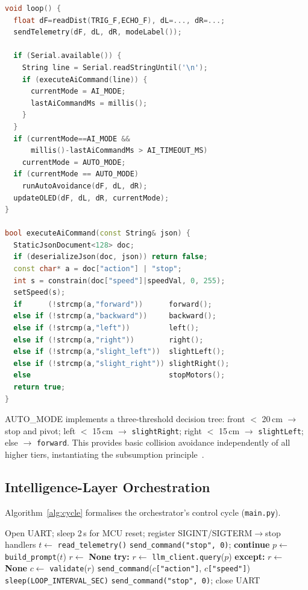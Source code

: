 \documentclass[conference]{IEEEtran}
\begin{document}
\begin{lstlisting}[language=C++, float=t, caption={Dual-mode loop and JSON dispatch (firmware, simplified)}, label={lst:firmware}]
void loop() {
  float dF=readDist(TRIG_F,ECHO_F), dL=..., dR=...;
  sendTelemetry(dF, dL, dR, modeLabel());

  if (Serial.available()) {
    String line = Serial.readStringUntil('\n');
    if (executeAiCommand(line)) {
      currentMode = AI_MODE;
      lastAiCommandMs = millis();
    }
  }
  if (currentMode==AI_MODE &&
      millis()-lastAiCommandMs > AI_TIMEOUT_MS)
    currentMode = AUTO_MODE;
  if (currentMode == AUTO_MODE)
    runAutoAvoidance(dF, dL, dR);
  updateOLED(dF, dL, dR, currentMode);
}

bool executeAiCommand(const String& json) {
  StaticJsonDocument<128> doc;
  if (deserializeJson(doc, json)) return false;
  const char* a = doc["action"] | "stop";
  int s = constrain(doc["speed"]|speedVal, 0, 255);
  setSpeed(s);
  if      (!strcmp(a,"forward"))      forward();
  else if (!strcmp(a,"backward"))     backward();
  else if (!strcmp(a,"left"))         left();
  else if (!strcmp(a,"right"))        right();
  else if (!strcmp(a,"slight_left"))  slightLeft();
  else if (!strcmp(a,"slight_right")) slightRight();
  else                                stopMotors();
  return true;
}
\end{lstlisting}

AUTO\_MODE implements a three-threshold decision tree:
front $<$ 20\,cm $\to$ stop and pivot;
left $<$ 15\,cm $\to$ \texttt{slightRight};
right $<$ 15\,cm $\to$ \texttt{slightLeft};
else $\to$ \texttt{forward}.
This provides basic collision avoidance independently of all higher tiers,
instantiating the subsumption principle~\cite{brooks1986robust}.

\subsection{Intelligence-Layer Orchestration}

Algorithm~\ref{alg:cycle} formalises the orchestrator's control cycle
(\texttt{main.py}).

\begin{algorithm}
\caption{Intelligence-layer control cycle (main.py)}
\label{alg:cycle}
\begin{algorithmic}[1]
\REQUIRE Open UART; sleep 2\,s for MCU reset;
         register SIGINT/SIGTERM$\to$stop handlers
  \STATE $t \leftarrow$ \texttt{read\_telemetry()}
    \STATE \texttt{send\_command("stop", 0)}; \textbf{continue}
  \ENDIF
  \STATE $p \leftarrow$ \texttt{build\_prompt}($t$)
  \STATE $r \leftarrow$ \textbf{None}
  \STATE \textbf{try:} $r \leftarrow$ \texttt{llm\_client.query}($p$)
  \STATE \textbf{except:} $r \leftarrow$ \textbf{None}
  \STATE $c \leftarrow$ \texttt{validate}($r$)
  \STATE \texttt{send\_command}($c$\texttt{["action"]}, $c$\texttt{["speed"]})
  \STATE \texttt{sleep(LOOP\_INTERVAL\_SEC)}
\ENDWHILE
\STATE \texttt{send\_command("stop",\,0)}; close UART
\end{algorithmic}
\end{algorithm}
\end{document}
